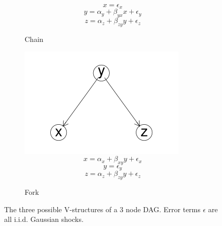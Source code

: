 \documentclass{article}
\begin{document}
\begin{figure}
\begin{subfigure}{0.3\textwidth}
    \small
    \begin{equation*}
      x = \epsilon_{x}
    \end{equation*}
    \begin{equation*}
      y = \alpha_y + \beta_{yx} x + \epsilon_{y}
    \end{equation*}
    \begin{equation*}
      z = \alpha_z + \beta_{zy} y + \epsilon_{z}
    \end{equation*}
    \caption{Chain}
    \label{chain}
  \end{subfigure}
  \begin{subfigure}{0.3\textwidth}
    \includegraphics[width=\linewidth]{images/fork.png}
    \small
    \begin{equation*}
      x = \alpha_x + \beta_{xy} y + \epsilon_{x}
    \end{equation*}
    \begin{equation*}
      y = \epsilon_{y}
    \end{equation*}
    \begin{equation*}
      z = \alpha_z + \beta_{zy} y + \epsilon_{z}
    \end{equation*}
    \caption{Fork}
    \label{fork}
  \end{subfigure}

  \caption{The three possible V-structures of a 3 node DAG. Error terms $\epsilon$ are all i.i.d. Gaussian shocks.}
  \label{dag5}
\end{figure}
\end{document}
